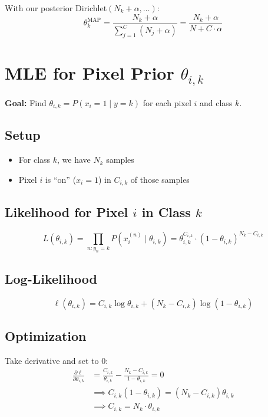 \documentclass[11pt]{article}
\begin{document}
With our posterior Dirichlet$(N_k + \alpha, \ldots)$:
\begin{equation}
\boxed{\theta_k^{\text{MAP}} = \frac{N_k + \alpha}{\sum_{j=1}^C (N_j + \alpha)} = \frac{N_k + \alpha}{N + C \cdot \alpha}}
\end{equation}

\section{MLE for Pixel Prior $\theta_{i,k}$}

\textbf{Goal:} Find $\theta_{i,k} = P(x_i = 1 \mid y = k)$ for each pixel $i$ and class $k$.

\subsection{Setup}
\begin{itemize}
\item For class $k$, we have $N_k$ samples
\item Pixel $i$ is ``on'' ($x_i = 1$) in $C_{i,k}$ of those samples
\end{itemize}

\subsection{Likelihood for Pixel $i$ in Class $k$}
\begin{equation}
L(\theta_{i,k}) = \prod_{n: y_n=k} P(x_i^{(n)} \mid \theta_{i,k}) = \theta_{i,k}^{C_{i,k}} \cdot (1 - \theta_{i,k})^{N_k - C_{i,k}}
\end{equation}

\subsection{Log-Likelihood}
\begin{equation}
\ell(\theta_{i,k}) = C_{i,k} \log \theta_{i,k} + (N_k - C_{i,k}) \log(1 - \theta_{i,k})
\end{equation}

\subsection{Optimization}
Take derivative and set to 0:
\begin{align}
\frac{\partial \ell}{\partial \theta_{i,k}} &= \frac{C_{i,k}}{\theta_{i,k}} - \frac{N_k - C_{i,k}}{1 - \theta_{i,k}} = 0 \\
&\implies C_{i,k}(1 - \theta_{i,k}) = (N_k - C_{i,k})\theta_{i,k} \\
&\implies C_{i,k} = N_k \cdot \theta_{i,k}
\end{align}
\end{document}
